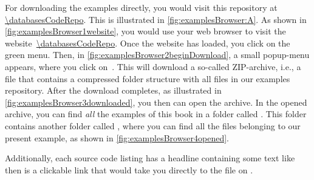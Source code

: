For downloading the examples directly, you would visit this repository at \expandafter\url{\databasesCodeRepo}.
This is illustrated in \cref{fig:examplesBrowser:A}.
As shown in \cref{fig:examplesBrowser1website}, you would use your web browser to visit the website~\expandafter\url{\databasesCodeRepo}.
Once the website has loaded, you click on the green  menu.
Then, in \cref{fig:examplesBrowser2beginDownload}, a small popup-menu appears, where you click on~.
This will download a so-called ZIP-archive, i.e., a file that contains a compressed folder structure with all files in our examples repository.
After the download completes, as illustrated in \cref{fig:examplesBrowser3downloaded}, you then can open the archive.
In the opened archive, you can find \emph{all} the examples of this book in a folder called .
This folder contains another folder called , where you can find all the files belonging to our present example, as shown in \cref{fig:examplesBrowser4opened}.

Additionally, each source code listing has a headline containing some text like~
 then is a clickable link that would take you directly to the file on \github.%
%
\FloatBarrier%
\endhsection%
%
